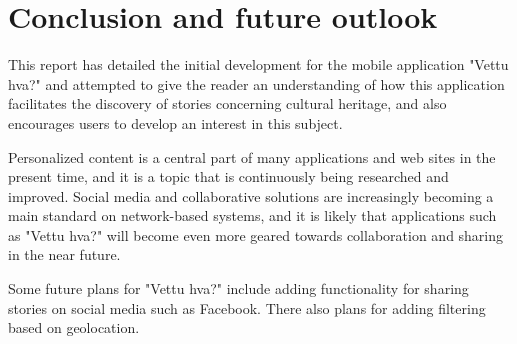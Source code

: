 
\chapter{Conclusion and future outlook}

This report has detailed the initial development for the mobile application "Vettu hva?" and attempted to give the reader an understanding of how this application facilitates the discovery of stories concerning cultural heritage, and also encourages users to develop an interest in this subject.\newline

Personalized content is a central part of many applications and web sites in the present time, and it is a topic that is continuously being researched and improved. Social media and collaborative solutions are increasingly becoming a main standard on network-based systems, and it is likely that applications such as "Vettu hva?" will become even more geared towards collaboration and sharing in the near future.\newline

Some future plans for "Vettu hva?" include adding functionality for sharing stories on social media such as Facebook. There also plans for adding filtering based on geolocation.


\cleardoublepage